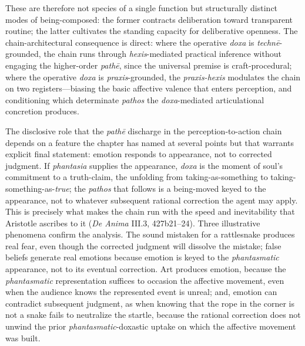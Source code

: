 \documentclass{article}
\begin{document}
These are therefore not species of a single function but structurally distinct modes of being-composed: the former contracts deliberation toward transparent routine; the latter cultivates the standing capacity for deliberative openness. The chain-architectural consequence is direct: where the operative \textit{doxa} is \textit{technē}-grounded, the chain runs through \textit{hexis}-mediated practical inference without engaging the higher-order \textit{pathē}, since the universal premise is craft-procedural; where the operative \textit{doxa} is \textit{praxis}-grounded, the \textit{praxis-hexis} modulates the chain on two registers---biasing the basic affective valence that enters perception, and conditioning which determinate \textit{pathos} the \textit{doxa}-mediated articulational concretion produces.

The disclosive role that the \textit{pathē} discharge in the perception-to-action chain depends on a feature the chapter has named at several points but that warrants explicit final statement: emotion responds to appearance, not to corrected judgment. If \textit{phantasia} supplies the appearance, \textit{doxa} is the moment of \textitthe soul's commitment to a truth-claim, the unfolding from taking-as-something to taking-something-as-\textit{true}; the \textit{pathos} that follows is a being-moved keyed to the appearance, not to whatever subsequent rational correction the agent may apply. This is precisely what makes the chain run with the speed and inevitability that Aristotle ascribes to it (\textit{De Anima} III.3, 427b21--24). Three illustrative phenomena confirm the analysis. The sound mistaken for a rattlesnake produces real fear, even though the corrected judgment will dissolve the mistake; false beliefs generate real emotions because emotion is keyed to the \textit{phantasmatic} appearance, not to its eventual correction. Art produces emotion, because the \textit{phantasmatic} representation suffices to occasion the affective movement, even when the audience knows the represented event is unreal; and, emotion can contradict subsequent judgment, as when knowing that the rope in the corner is not a snake fails to neutralize the startle, because the rational correction does not unwind the prior \textit{phantasmatic}-doxastic uptake on which the affective movement was built.
\end{document}
